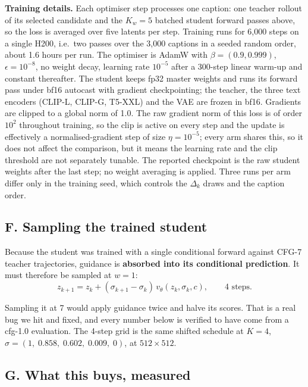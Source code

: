 \documentclass[11pt,a4paper]{article}
\begin{document}
\vspace{0.5em}
\noindent\textbf{Training details.} Each optimiser step processes one caption: one teacher rollout of its selected candidate and the $K_w = 5$ batched student forward passes above, so the loss is averaged over five latents per step. Training runs for 6{,}000 steps on a single H200, i.e.\ two passes over the 3{,}000 captions in a seeded random order, about 1.6 hours per run. The optimiser is AdamW with $\beta = (0.9, 0.999)$, $\epsilon = 10^{-8}$, no weight decay, learning rate $10^{-5}$ after a 300-step linear warm-up and constant thereafter. The student keeps fp32 master weights and runs its forward pass under bf16 autocast with gradient checkpointing; the teacher, the three text encoders (CLIP-L, CLIP-G, T5-XXL) and the VAE are frozen in bf16. Gradients are clipped to a global norm of 1.0. The raw gradient norm of this loss is of order $10^2$ throughout training, so the clip is active on every step and the update is effectively a normalised-gradient step of size $\eta = 10^{-5}$; every arm shares this, so it does not affect the comparison, but it means the learning rate and the clip threshold are not separately tunable. The reported checkpoint is the raw student weights after the last step; no weight averaging is applied. Three runs per arm differ only in the training seed, which controls the $\Delta_k$ draws and the caption order.

\subsection*{F. Sampling the trained student}

Because the student was trained with a single conditional forward against CFG-7 teacher trajectories, guidance is \textbf{absorbed into its conditional prediction}. It must therefore be sampled at $w = 1$:
\begin{equation}
z_{k+1} = z_k + (\sigma_{k+1}-\sigma_k)\, v_\theta(z_k,\sigma_k,c), \qquad 4 \text{ steps}.
\end{equation}

Sampling it at 7 would apply guidance twice and halve its scores. That is a real bug we hit and fixed, and every number below is verified to have come from a cfg-1.0 evaluation. The 4-step grid is the same shifted schedule at $K = 4$, $\sigma = (1,\; 0.858,\; 0.602,\; 0.009,\; 0)$, at $512\times512$.

\subsection*{G. What this buys, measured}
\end{document}
